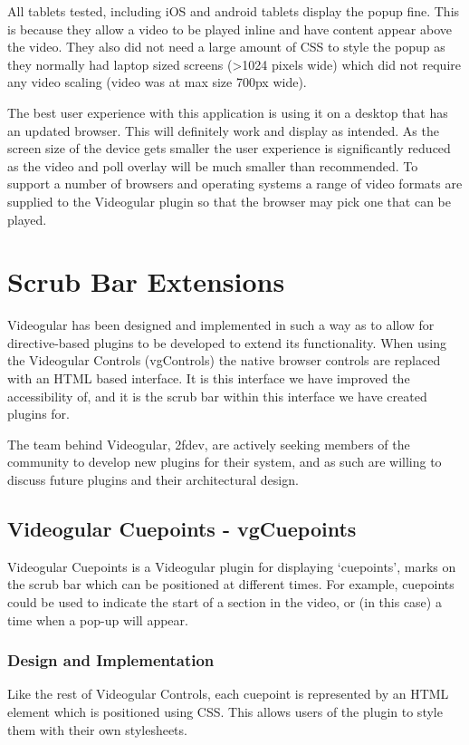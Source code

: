 All tablets tested, including iOS and android tablets display the popup fine. This is because they allow a video to be played inline and have content appear above the video. They also did not need a large amount of \gls{CSS} to style the popup as they normally had laptop sized screens (\textgreater 1024 pixels wide) which did not require any video scaling (video was at max size 700px wide).

The best user experience with this application is using it on a desktop that has an updated browser. This will definitely work and display as intended. As the screen size of the device gets smaller the user experience is significantly reduced as the video and poll overlay will be much smaller than recommended. To support a number of browsers and operating systems a range of video formats are supplied to the \gls{Videogular} plugin so that the browser may pick one that can be played.

\section{Scrub Bar Extensions}
\label{Section:Scrub Bar Extensions}

\gls{Videogular} has been designed and implemented in such a way as to allow for directive-based plugins to be developed to extend its functionality. When using the \gls{Videogular} Controls (vgControls) the native browser controls are replaced with an HTML based interface. It is this interface we have improved the accessibility of, and it is the scrub bar within this interface we have created plugins for.

The team behind \gls{Videogular}, 2fdev, are actively seeking members of the community to develop new plugins for their system, and as such are willing to discuss future plugins and their architectural design.

\subsection{Videogular Cuepoints - vgCuepoints}
\label{Subsection:vgCuepoints}
\gls{Videogular} Cuepoints is a \gls{Videogular} plugin for displaying `cuepoints', marks on the scrub bar which can be positioned at different times. For example, cuepoints could be used to indicate the start of a section in the video, or (in this case) a time when a pop-up will appear.

\subsubsection{Design and Implementation}
Like the rest of Videogular Controls, each cuepoint is represented by an HTML element which is positioned using \gls{CSS}. This allows users of the plugin to style them with their own stylesheets.

